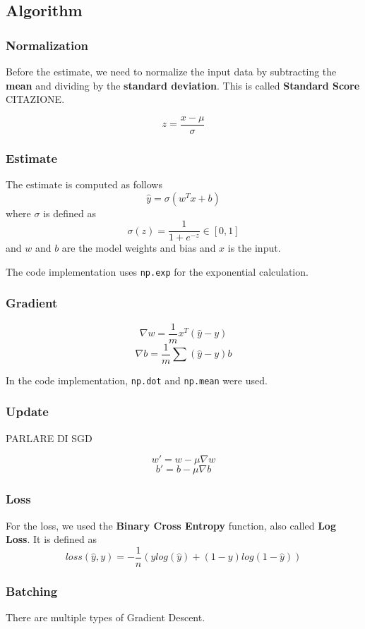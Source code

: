 \documentclass[
	letterpaper, %
	10pt, %
]{class}
\begin{document}
\subsection{Algorithm}

\subsubsection{Normalization}
Before the estimate, we need to normalize the input data by subtracting the \textbf{mean} and dividing by the \textbf{standard deviation}. This is called \textbf{Standard Score} CITAZIONE.

$$ z = \frac{x - \mu}{\sigma} $$

\subsubsection{Estimate}
The estimate is computed as follows
$$ \hat{y} = \sigma(w^Tx + b) $$
where $\sigma$ is defined as
$$ \sigma(z) = \frac{1}{1 + e^{-z}} \in [0,1] $$
and $w$ and $b$ are the model weights and bias and $x$ is the input.

The code implementation uses \texttt{np.exp} for the exponential calculation.

\subsubsection{Gradient}

$$ \nabla w = \frac{1}{m}x^T(\hat{y} - y) $$
$$ \nabla b = \frac{1}{m}\sum(\hat{y} - y) b $$

In the code implementation, \texttt{np.dot} and \texttt{np.mean} were used.

\subsubsection{Update}

PARLARE DI SGD

$$ w' = w - \mu \nabla w $$
$$ b' = b - \mu \nabla b $$

\subsubsection{Loss}
For the loss, we used the \textbf{Binary Cross Entropy} function, also called \textbf{Log Loss}.
It is defined as
$$ loss(\hat{y}, y) = -\frac{1}{n}(y log(\hat{y}) + (1-y)log(1-\hat{y})) $$

\subsubsection{Batching}
There are multiple types of Gradient Descent.\\
\end{document}
